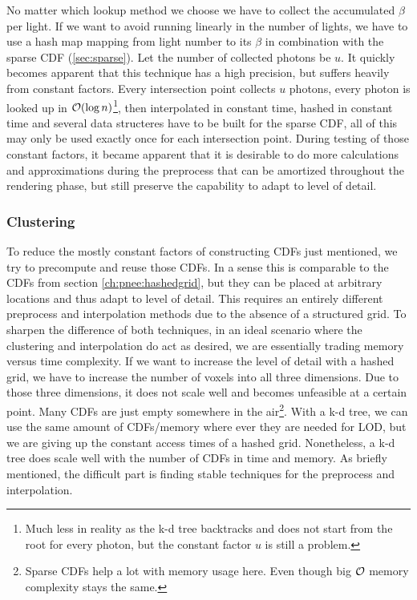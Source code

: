 No matter which lookup method we choose we have to collect the accumulated $\beta$ per light. If we want to avoid running linearly in the number of lights, we have to use a hash map mapping from light number to its $\beta$ in combination with the sparse CDF (\ref{sec:sparse}). Let the number of collected photons be $u$. It quickly becomes apparent that this technique has a high precision, but suffers heavily from constant factors. Every intersection point collects $u$ photons, every photon is looked up in $\mathcal{O}(\log n)$\footnote{Much less in reality as the k-d tree backtracks and does not start from the root for every photon, but the constant factor $u$ is still a problem.}, then interpolated in constant time, hashed in constant time and several data structeres have to be built for the sparse CDF, all of this may only be used exactly once for each intersection point. During testing of those constant factors, it became apparent that it is desirable to do more calculations and approximations during the preprocess that can be amortized throughout the rendering phase, but still preserve the capability to adapt to level of detail.

\subsubsection{Clustering}

To reduce the mostly constant factors of constructing CDFs just mentioned, we try to precompute and reuse those CDFs. In a sense this is comparable to the CDFs from section \ref{ch:pnee:hashedgrid}, but they can be placed at arbitrary locations and thus adapt to level of detail. This requires an entirely different preprocess and interpolation methods due to the absence of a structured grid. To sharpen the difference of both techniques, in an ideal scenario where the clustering and interpolation do act as desired, we are essentially trading memory versus time complexity. If we want to increase the level of detail with a hashed grid, we have to increase the number of voxels into all three dimensions. Due to those three dimensions, it does not scale well and becomes unfeasible at a certain point. Many CDFs are just empty somewhere in the air\footnote{Sparse CDFs help a lot with memory usage here. Even though big $\mathcal{O}$ memory complexity stays the same.}. With a k-d tree, we can use the same amount of CDFs/memory where ever they are needed for LOD, but we are giving up the constant access times of a hashed grid. Nonetheless, a k-d tree does scale well with the number of CDFs in time and memory. As briefly mentioned, the difficult part is finding stable techniques for the preprocess and interpolation.


